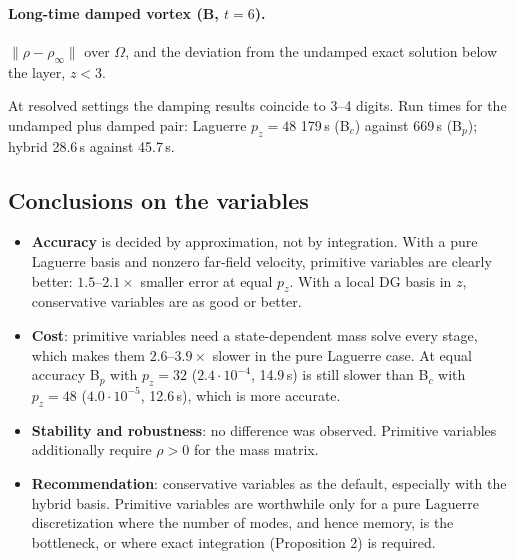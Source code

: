 \documentclass[11pt,a4paper]{article}
\begin{document}
\paragraph{Long-time damped vortex (B, $t=6$).}
$\|\rho-\rho_\infty\|$ over $\Omega$, and the deviation from the undamped exact
solution below the layer, $z<3$.
\begin{center}
\end{center}
At resolved settings the damping results coincide to 3--4 digits. Run times for the
undamped plus damped pair: Laguerre $p_z=48$ 179\,s (B$_c$) against 669\,s (B$_p$);
hybrid 28.6\,s against 45.7\,s.

\subsection{Conclusions on the variables}
\begin{itemize}
\item \textbf{Accuracy} is decided by approximation, not by integration. With a pure
  Laguerre basis and nonzero far-field velocity, primitive variables are clearly
  better: $1.5$--$2.1\times$ smaller error at equal $p_z$. With a local DG basis in $z$, conservative
  variables are as good or better.
\item \textbf{Cost}: primitive variables need a state-dependent mass solve every
  stage, which makes them $2.6$--$3.9\times$ slower in the pure Laguerre case. At
  equal accuracy B$_p$ with $p_z=32$ ($2.4\cdot10^{-4}$, 14.9\,s) is still slower than
  B$_c$ with $p_z=48$ ($4.0\cdot10^{-5}$, 12.6\,s), which is more accurate.
\item \textbf{Stability and robustness}: no difference was observed. Primitive
  variables additionally require $\rho>0$ for the mass matrix.
\item \textbf{Recommendation}: conservative variables as the default, especially
  with the hybrid basis. Primitive variables are worthwhile only for a pure Laguerre
  discretization where the number of modes, and hence memory, is the bottleneck, or
  where exact integration (Proposition 2) is required.
\end{itemize}
\end{document}
